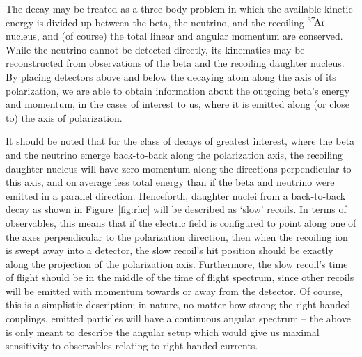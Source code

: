 The decay may be treated as a three-body problem in which the available kinetic energy is divided up between the beta, the neutrino, and the recoiling $^{37}\textrm{\!Ar}$ nucleus, and (of course) the total linear and angular momentum are conserved.  While the neutrino cannot be detected directly, its kinematics may be reconstructed from observations of the beta and the recoiling daughter nucleus.  By placing detectors above and below the decaying atom along the axis of its polarization, we are able to obtain information about the outgoing beta's energy and momentum, in the cases of interest to us, where it is emitted along (or close to) the axis of polarization.  

It should be noted that for the class of decays of greatest interest, where the beta and the neutrino emerge back-to-back along the polarization axis, the recoiling daughter nucleus will have zero momentum along the directions perpendicular to this axis, and on average less total energy than if the beta and neutrino were emitted in a parallel direction.  Henceforth, daughter nuclei from a back-to-back decay as shown in Figure~\ref{fig:rhc} will be described as `slow' recoils.  In terms of observables, 
this means that if the electric field is configured to point along one of the axes perpendicular to the polarization direction, then when the recoiling ion is swept away into a detector, the slow recoil's hit position should be exactly along the projection of the polarization axis.  Furthermore, the slow recoil's time of flight should be in the middle of the time of flight spectrum, since other recoils will be emitted with momentum towards or away from the detector.  Of course, this is a simplistic description; in nature, no matter how strong the right-handed couplings, emitted particles will have a continuous angular spectrum -- the above is only meant to describe the angular setup which would give us maximal sensitivity to observables relating to right-handed currents.  

